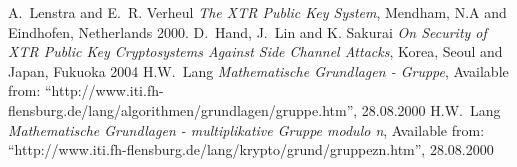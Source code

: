 \documentclass[10pt,        %
               a4paper,     %
               journal,     %
               ]{IEEEtran}
\begin{document}
\ifCLASSOPTIONcaptionsoff
  \newpage
\fi






\begin{thebibliography}{1}

 A.~Lenstra and E.~R. Verheul \emph{The XTR Public Key System}, \relax Mendham, N.A and Eindhofen, Netherlands 2000.
D.~Hand, J.~Lin and K. Sakurai \emph{On Security of XTR Public Key Cryptosystems Against Side Channel Attacks}, \relax Korea, Seoul and Japan, Fukuoka 2004
H.W.~Lang \emph{Mathematische Grundlagen - Gruppe}, \relax \newline Available from: "`http://www.iti.fh-flensburg.de/lang/algorithmen/grundlagen/gruppe.htm"',
28.08.2000
H.W.~Lang \emph{Mathematische Grundlagen - multiplikative Gruppe modulo n}, \relax \newline Available from: "`http://www.iti.fh-flensburg.de/lang/krypto/grund/gruppezn.htm"',
28.08.2000



\end{thebibliography}
\end{document}
